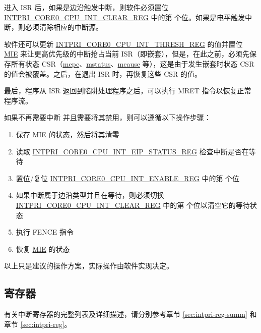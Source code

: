 \documentclass[main\_\_CN.tex]{subfiles}
\begin{document}
进入 ISR 后，如果是边沿触发中断，则软件必须置位 \hyperref[regdesc:INTPRICORE0CPUINTCLEARREG]{INTPRI\_CORE0\_CPU\_INT\_CLEAR\_REG} 中的第  个位。如果是电平触发中断，则必须清除相应的中断源。

软件还可以更新 \hyperref[regdesc:INTPRICORE0CPUINTTHRESHREG]{INTPRI\_CORE0\_CPU\_INT\_THRESH\_REG} 的值并置位 \hyperref[fielddesc:MSTATUSMIE]{MIE} 来让更高优先级的中断抢占当前 ISR（即嵌套），但是，在此之前，必须先保存所有状态 CSR（\hyperref[regdesc:MEPC]{mepc}、\hyperref[regdesc:MSTATUS]{mstatus}、\hyperref[regdesc:MCAUSE]{mcause} 等），这是由于发生嵌套时状态 CSR 的值会被覆盖。之后，在退出 ISR 时，再恢复这些 CSR 的值。

最后，程序从 ISR 返回到陷阱处理程序之后，可以执行 MRET 指令以恢复正常程序流。

如果不再需要中断  并且需要将其禁用，则可以遵循以下操作步骤：
\begin{enumerate}
    \item 保存 \hyperref[fielddesc:MSTATUSMIE]{MIE} 的状态，然后将其清零
    \item 读取 \hyperref[regdesc:INTPRICORE0CPUINTEIPSTATUSREG]{INTPRI\_CORE0\_CPU\_INT\_EIP\_STATUS\_REG} 检查中断是否在等待
    \item 置位/复位 \hyperref[regdesc:INTPRICORE0CPUINTENABLEREG]{INTPRI\_CORE0\_CPU\_INT\_ENABLE\_REG} 中的第  个位
    \item 如果中断属于边沿类型并且在等待，则必须切换 \hyperref[regdesc:INTPRICORE0CPUINTCLEARREG]{INTPRI\_CORE0\_CPU\_INT\_CLEAR\_REG} 中的第  个位以清空它的等待状态
    \item 执行 FENCE 指令
    \item 恢复 \hyperref[fielddesc:MSTATUSMIE]{MIE} 的状态
\end{enumerate}

以上只是建议的操作方案，实际操作由软件实现决定。


\hypertarget{riscvcpu-int-reg-summ}{}
\subsection{寄存器}
\label{sec:riscvcpu-int-reg-summ}

有关中断寄存器的完整列表及详细描述，请分别参考章节 \ref{sec:intpri-reg-summ} 和章节 \ref{sec:intpri-reg}。


\end{document}

